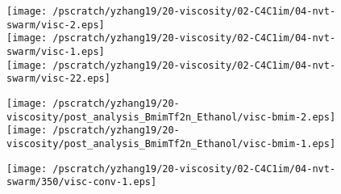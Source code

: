 \documentclass[12pt]{article}
\begin{document}
\newpage
\clearpage
\begin{figure}
\begin{center}
\texttt{[image: /pscratch/yzhang19/20-viscosity/02-C4C1im/04-nvt-swarm/visc-2.eps]}
\\
\texttt{[image: /pscratch/yzhang19/20-viscosity/02-C4C1im/04-nvt-swarm/visc-1.eps]}
\\
\texttt{[image: /pscratch/yzhang19/20-viscosity/02-C4C1im/04-nvt-swarm/visc-22.eps]}
\caption{}
\label{fig:bmim-ave}
\end{center}
\end{figure}


\newpage
\clearpage
\begin{figure}
\begin{center}
\texttt{[image: /pscratch/yzhang19/20-viscosity/post\_analysis\_BmimTf2n\_Ethanol/visc-bmim-2.eps]}
\\
\texttt{[image: /pscratch/yzhang19/20-viscosity/post\_analysis\_BmimTf2n\_Ethanol/visc-bmim-1.eps]}
\caption{}
\label{fig:bmim-visc}
\end{center}
\end{figure}


\newpage
\clearpage
\begin{figure}
\begin{center}
\texttt{[image: /pscratch/yzhang19/20-viscosity/02-C4C1im/04-nvt-swarm/350/visc-conv-1.eps]}
\caption{}
\label{fig:bmim-num}
\end{center}
\end{figure}

\end{document}
